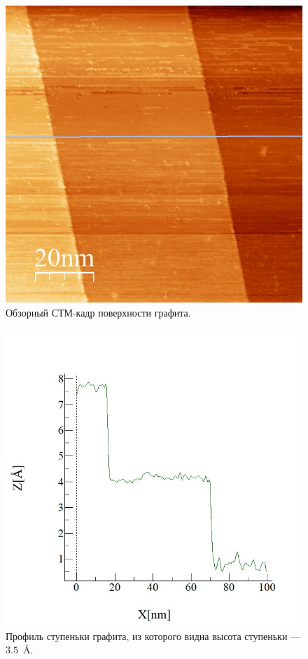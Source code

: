 \documentclass[a4paper, 12pt]{article}
\begin{document}
	\begin{figure}[H]
		\centering
		\includegraphics[width=0.6\linewidth]{../STM_data/Step/Step_final}
		\caption{Обзорный СТМ-кадр поверхности графита.}
		\label{fig:2_step}
	\end{figure}
	
	\begin{figure}[H]
		\centering
		\includegraphics[width=0.6\linewidth]{../STM_data/Step/Step_final_Graph_enh.jpg}
		\caption{Профиль ступеньки графита, из которого видна высота ступеньки --- $3.5$~\AA.}
		\label{fig:2_step_anal}
	\end{figure}
\end{document}
